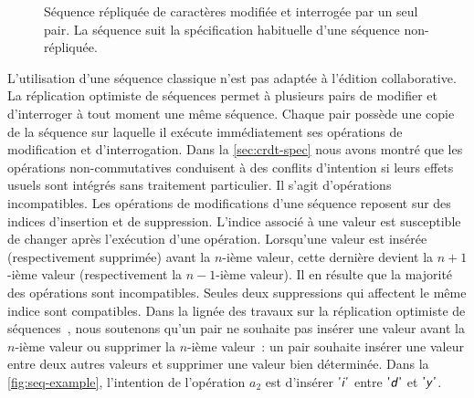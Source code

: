 \begin{figure}[htb]
    \newcommand*\hsep{1.2}
    \centering
    \caption[Séquence répliquée de caractères modifiée et interrogée par un seul pair]{Séquence répliquée de caractères modifiée et interrogée par un seul pair.
    La séquence suit la spécification habituelle d'une séquence non-répliquée.}\label{fig:seq-example}
\end{figure}

L'utilisation d'une séquence classique n'est pas adaptée à l'édition collaborative.
La réplication optimiste de séquences permet à plusieurs pairs de modifier et d'interroger à tout moment une même séquence.
Chaque pair possède une copie de la séquence sur laquelle il exécute immédiatement ses opérations de modification et d'interrogation.
Dans la \autoref{sec:crdt-spec} nous avons montré que les opérations non-commutatives conduisent à des conflits d'intention si leurs effets usuels sont intégrés sans traitement particulier.
Il s'agit d'opérations incompatibles.
Les opérations de modifications d'une séquence reposent sur des indices d'insertion et de suppression.
L'indice associé à une valeur est susceptible de changer après l'exécution d'une opération.
Lorsqu'une valeur est insérée (respectivement supprimée) avant la $n$-ième valeur, cette dernière devient la $n+1$-ième valeur (respectivement la $n-1$-ième valeur).
Il en résulte que la majorité des opérations sont incompatibles.
Seules deux suppressions qui affectent le même indice sont compatibles.
Dans la lignée des travaux sur la réplication optimiste de séquences~\autocite{oster_2006_woot,sun_1998_cci}, nous soutenons qu'un pair ne souhaite pas insérer une valeur avant la $n$-ième valeur ou supprimer la $n$-ième valeur~: un pair souhaite insérer une valeur entre deux autres valeurs et supprimer une valeur bien déterminée.
Dans la \autoref{fig:seq-example}, l'intention de l'opération $a_2$ est d'insérer $\textsf{'\textit{i}'}$ entre $\textsf{'\textit{d}'}$ et $\textsf{'\textit{y}'}$.

